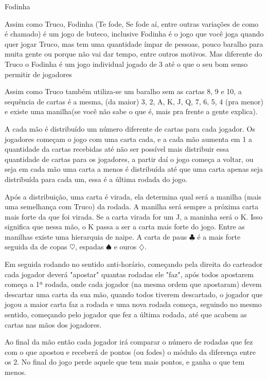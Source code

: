 \begin{subsecao}{Fodinha}

Assim como Truco, Fodinha (Te fode, Se fode aí, entre outras variações de como é chamado) é um jogo de buteco, inclusive Fodinha é o jogo
que você joga quando quer jogar Truco, mas tem uma quantidade ímpar de 
pessoas, pouco baralho para muita gente ou porque não vai dar tempo, entre outros motivos. Mas
diferente do Truco o Fodinha é um jogo individual jogado de 3 até o que o seu bom senso permitir de jogadores

Assim como Truco também utiliza-se um baralho sem as cartas 8, 9 e 10, a sequência
de cartas é a mesma, (da maior) 3, 2, A, K, J, Q, 7, 6, 5, 4 (pra menor)
e existe uma manilha(se você não sabe o que é, mais pra frente a gente explica).

A cada mão é distribuído um número diferente de cartas para cada jogador. Os
jogadores começam o jogo com uma carta cada, e a cada mão aumenta em 1 a
quantidade da cartas recebidas até não ser possível mais distribuir essa quantidade de cartas para os jogadores, a partir daí 
o jogo começa a voltar, ou seja em cada mão uma carta a menos é distribuída até que uma carta apenas seja distribuída para 
cada um, essa é a última rodada do jogo. 

Após a distribuição, uma carta é virada, ela determina qual será a 
manilha (mais uma semelhança com Truco) da rodada. A manilha será sempre a próxima carta mais forte da que foi virada.
Se a carta virada for um J, a maninha será o K. Isso significa que nessa mão, o
K passa a ser a carta mais forte do jogo. Entre as manilhas existe uma
hierarquia de naipe. A carta de paus $\clubsuit$  é a mais forte seguida da de copas $\heartsuit$,
espadas $\spadesuit$ e ouros $\diamondsuit$.

Em seguida rodando no sentido anti-horário, começando pela direita do carteador cada jogador deverá "apostar" 
quantas rodadas ele "faz", após todos apostarem começa a 1ª rodada, onde cada jogador (na mesma ordem que apostaram) 
devem descartar uma carta da sua mão, quando todos tiverem descartado, o jogador que jogou a maior carta faz a rodada 
e uma nova rodada começa, seguindo no mesmo sentido, começando pelo jogador que fez a última rodada, até que acabem
as cartas nas mãos dos jogadores.

Ao final da mão então cada jogador irá comparar o número de rodadas que fez com o que apostou e receberá de pontos (ou fodes) 
o módulo da diferença entre os 2. No final do jogo perde aquele que tem mais pontos, e ganha o que tem menos.


\end{subsecao}

